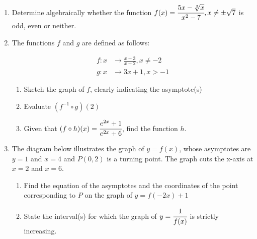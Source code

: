 \documentclass[letterpaper]{article}
\begin{document}
\begin{enumerate}
\item Determine algebraically whether the function $f(x) = \cfrac{5x - \sqrt[3]{x}}{x^2 - 7}, x \ne \pm\sqrt{7}$ is odd, even or neither.

\item The functions $f$ and $g$ are defined as follows:

\begin{align*}
f:x &\to \frac{x-3}{x+2}, x \ne -2 \\
g:x &\to 3x+1, x > -1
\end{align*}

\begin{enumerate}
\item Sketch the graph of $f$, clearly indicating the asymptote(s)

\item Evaluate $(f^{-1} \circ g)(2)$

\item Given that $(f \circ h)(x) = \cfrac{e^{2x} + 1}{e^{2x} + 6}$, find the function $h$.
\end{enumerate}

\item The diagram below illustrates the graph of $y=f(x)$, whose asymptotes are $y=1$ and $x=4$ and $P(0,2)$ is a turning point. The graph cuts the x-axis at $x=2$ and $x=6$.



\begin{enumerate}
\item Find the equation of the asymptotes and the coordinates of the point corresponding to $P$ on the graph of $y=f(-2x) + 1$

\item State the interval(s) for which the graph of $y=\cfrac{1}{f(x)}$ is strictly increasing.
\end{enumerate}
\end{enumerate}
\end{document}
